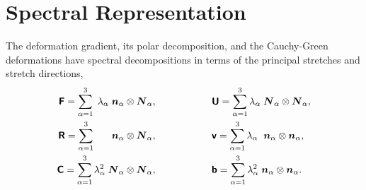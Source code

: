 \section{Spectral Representation}
The deformation gradient, its polar decomposition, and the Cauchy-Green deformations have spectral decompositions in terms of the principal stretches and stretch directions, 
\begin{align}
\tFbold = \sum_{\alpha = 1}^3 \; \lambda_{\alpha} \;\vn_{\alpha} \otimes \vN_{\alpha}, \hspace{2cm} 
& 
\tUbold = \sum_{\alpha = 1}^3 \lambda_{\alpha} \;\vN_{\alpha} \otimes \vN_{\alpha}, \\
%
\tRbold = \sum_{\alpha = 1}^3 \;\;\;\;\;\;\vn_{\alpha} \otimes \vN_{\alpha}, \hspace{2cm} 
& 
\tvbold = \sum_{\alpha = 1}^3 \lambda_{\alpha} \;\;\vn_{\alpha} \otimes \vn_{\alpha}, \\
%
\tCbold = \sum_{\alpha = 1}^3 \lambda^2_{\alpha} \;\vN_{\alpha} \otimes \vN_{\alpha}, \hspace{2cm} 
& 
\tbbold = \sum_{\alpha = 1}^3 \lambda^2_{\alpha} \;\vn_{\alpha} \otimes \vn_{\alpha}. 
\end{align}

